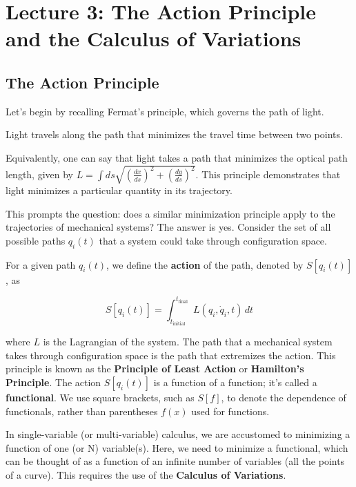 \section{Lecture 3: The Action Principle and the Calculus of Variations}

\subsection{The Action Principle}

Let's begin by recalling Fermat's principle, which governs the path of light.

\begin{definition}
    Light travels along the path that minimizes the travel time between two points.
\end{definition}

Equivalently, one can say that light takes a path that minimizes the optical path length, 
given by $L = \int ds \sqrt{\left(\frac{dx}{ds}\right)^2 + \left(\frac{dy}{ds}\right)^2}$. This principle demonstrates that light minimizes a particular quantity in its trajectory.

This prompts the question: does a similar minimization principle apply to the 
trajectories of mechanical systems? The answer is yes. Consider the set of all possible 
paths $q_i(t)$ that a system could take through configuration space.

For a given path $q_i(t)$, we define the \textbf{action} of the path, denoted by 
$S[q_i(t)]$, as

\[
    S[q_i(t)] = \int_{t_{\text{initial}}}^{t_{\text{final}}} L(q_i, \dot{q}_i, t) \, dt
\]

where $L$ is the Lagrangian of the system. The path that a mechanical system takes 
through configuration space is the path that extremizes the action. This principle is 
known as the \textbf{Principle of Least Action} or \textbf{Hamilton's Principle}. The 
action $S[q_i(t)]$ is a function of a function; it's called a \textbf{functional}. We use 
square brackets, such as $S[f]$, to denote the dependence of functionals, rather than 
parentheses $f(x)$ used for functions.

In single-variable (or multi-variable) calculus, we are accustomed to minimizing a 
function of one (or N) variable(s). Here, we need to minimize a functional, which can be 
thought of as a function of an infinite number of variables (all the points of a curve). 
This requires the use of the \textbf{Calculus of Variations}.

